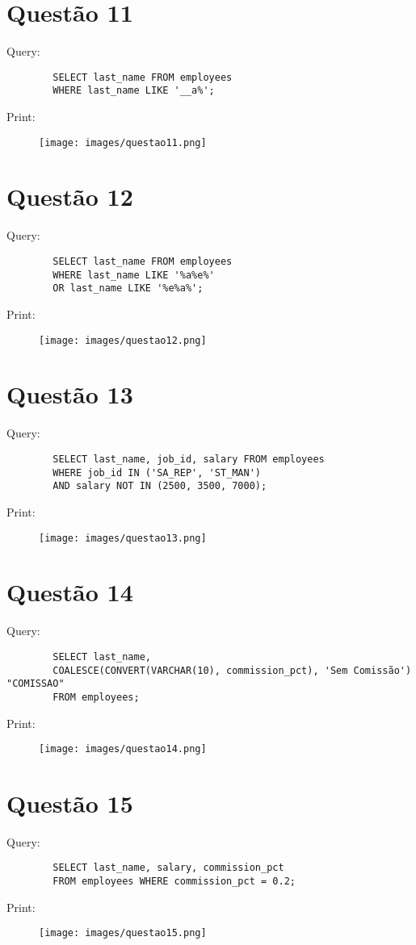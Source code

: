 \documentclass{article}[twocolumn]
\begin{document}
	\section{Quest\~ao 11}
	Query:
	\begin{verbatim}
		SELECT last_name FROM employees
		WHERE last_name LIKE '__a%';
	\end{verbatim}
	Print:
	\begin{figure}[H]
		\centering
		\texttt{[image: images/questao11.png]}
	\end{figure}
	\newpage
	\section{Quest\~ao 12}
	Query:
	\begin{verbatim}
		SELECT last_name FROM employees
		WHERE last_name LIKE '%a%e%'
		OR last_name LIKE '%e%a%';
	\end{verbatim}
	Print:
	\begin{figure}[H]
		\centering
		\texttt{[image: images/questao12.png]}
	\end{figure}
	\newpage
	\section{Quest\~ao 13}
	Query:
	\begin{verbatim}
		SELECT last_name, job_id, salary FROM employees
		WHERE job_id IN ('SA_REP', 'ST_MAN')
		AND salary NOT IN (2500, 3500, 7000);
	\end{verbatim}
	Print:
	\begin{figure}[H]
		\centering
		\texttt{[image: images/questao13.png]}
	\end{figure}
	\newpage
	\section{Quest\~ao 14}
	Query:
	\begin{verbatim}
		SELECT last_name,
		COALESCE(CONVERT(VARCHAR(10), commission_pct), 'Sem Comissão') "COMISSAO"
		FROM employees;
	\end{verbatim}
	Print:
	\begin{figure}[H]
		\centering
		\texttt{[image: images/questao14.png]}
	\end{figure}
	\newpage
	\section{Quest\~ao 15}
	Query:
	\begin{verbatim}
		SELECT last_name, salary, commission_pct
		FROM employees WHERE commission_pct = 0.2;
	\end{verbatim}
	Print:
	\begin{figure}[H]
		\centering
		\texttt{[image: images/questao15.png]}
	\end{figure}
	\newpage
\end{document}

